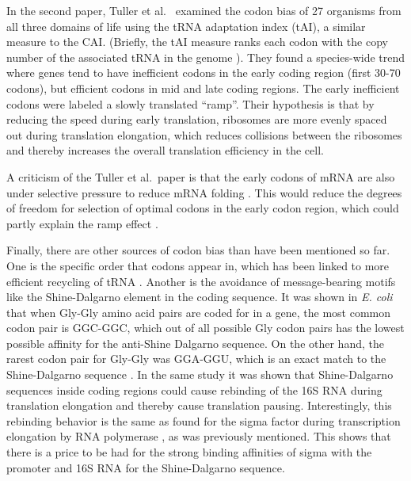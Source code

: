In the second paper, Tuller et al.\ \cite{tuller_evolutionarily_2010} examined
the codon bias of 27 organisms from all three domains of life using the tRNA
adaptation index (tAI), a similar measure to the CAI. (Briefly, the tAI measure
ranks each codon with the copy number of the associated tRNA in the genome
\cite{tuller_evolutionarily_2010}). They found a species-wide trend where genes
tend to have inefficient codons in the early coding region (first 30-70
codons), but efficient codons in mid and late coding regions. The early
inefficient codons were labeled a slowly translated ``ramp''. Their hypothesis
is that by reducing the speed during early translation, ribosomes are more
evenly spaced out during translation elongation, which reduces collisions
between the ribosomes and thereby increases the overall translation efficiency
in the cell.

A criticism of the Tuller et al.\ paper is that the early codons of mRNA are
also under selective pressure to reduce mRNA folding \cite{gu_universal_2010}.
This would reduce the degrees of freedom for selection of optimal codons in the
early codon region, which could partly explain the ramp effect
\cite{plotkin_synonymous_2011}.

Finally, there are other sources of codon bias than have been mentioned so far.
One is the specific order that codons appear in, which has been linked to more
efficient recycling of tRNA \cite{cannarozzi_role_2010}. Another is the
avoidance of message-bearing motifs like the Shine-Dalgarno element in the
coding sequence. It was shown in \textit{E. coli} that when Gly-Gly amino acid
pairs are coded for in a gene, the most common codon pair is GGC-GGC, which out
of all possible Gly codon pairs has the lowest possible affinity for the
anti-Shine Dalgarno sequence. On the other hand, the rarest codon pair for
Gly-Gly was GGA-GGU, which is an exact match to the Shine-Dalgarno sequence
\cite{li_anti-shine-dalgarno_2012}. In the same study it was shown that
Shine-Dalgarno sequences inside coding regions could cause rebinding of the 16S
RNA during translation elongation and thereby cause translation pausing.
Interestingly, this rebinding behavior is the same as found for the sigma
factor during transcription elongation by RNA polymerase
\cite{mooney_sigma_2005}, as was previously mentioned. This shows that there is
a price to be had for the strong binding affinities of sigma with the promoter
and 16S RNA for the Shine-Dalgarno sequence.
